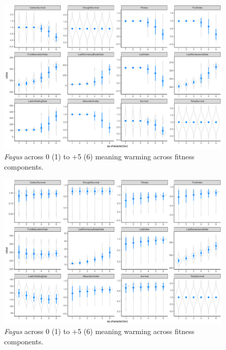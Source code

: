 \documentclass[11pt,letter]{article}
\begin{document}
\begin{figure} 
 \begin{center}
\noindent \includegraphics[width=1\textwidth]{..//analyses/graphs/phenofit/sims/meansim41_allmetricsFS.pdf}
  \caption{\emph{Fagus} across 0 (1) to $+$5 (6) meaning warming across fitness components.}
  \label{fig:fagusmean41}
  \end{center}
\end{figure}

\begin{figure} 
 \begin{center}
\noindent \includegraphics[width=1\textwidth]{..//analyses/graphs/phenofit/sims/meansim53_allmetricsFS.pdf}
  \caption{\emph{Fagus} across 0 (1) to $+$5 (6) meaning warming across fitness components.}
  \label{fig:fagusmean53}
  \end{center}
\end{figure}
\end{document}
